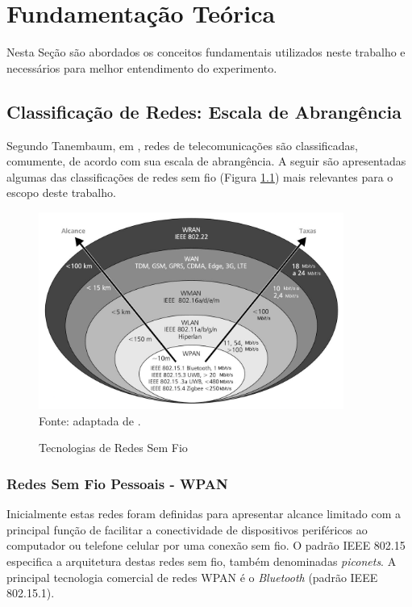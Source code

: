 \chapter{Fundamentação Teórica}
\label{fundamentacao}
Nesta Seção são abordados os conceitos fundamentais utilizados neste trabalho e necessários para melhor entendimento do experimento.

\section{Classificação de Redes: Escala de Abrangência}
\label{classRedes}
Segundo Tanembaum, em \cite{tanembaum2011}, redes de telecomunicações são classificadas, comumente, de acordo com sua escala de abrangência. A seguir são apresentadas algumas das classificações de redes sem fio (Figura \ref{fig:tecnologias_redes_semfiof}) mais relevantes para o escopo deste trabalho.

\begin{figure}[ht]
      \begin{center}
            \caption{Tecnologias de Redes Sem Fio}
            \includegraphics[width=10cm]{./sections/textual/chapters/images/tecnologias_redes_semfio.png}\\
            Fonte: adaptada de \cite{rochol2018sistemas}.
            \label{fig:tecnologias_redes_semfiof}
      \end{center}
\end{figure}

\subsection{Redes Sem Fio Pessoais - WPAN}
Inicialmente estas redes foram definidas para apresentar alcance limitado com a principal função de facilitar a conectividade de dispositivos periféricos ao computador ou telefone celular por uma conexão sem fio. O padrão IEEE 802.15 especifica a arquitetura destas redes sem fio, também denominadas \emph{piconets}. A principal  tecnologia comercial de redes WPAN é o \emph{Bluetooth} (padrão IEEE 802.15.1).

